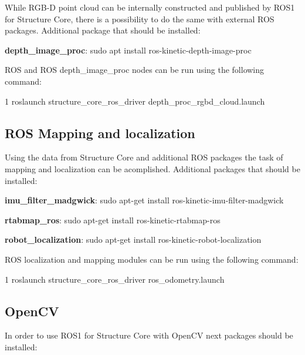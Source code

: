While R\+G\+B-\/D point cloud can be internally constructed and published by R\+O\+S1 for Structure Core, there is a possibility to do the same with external R\+OS packages. Additional package that should be installed\+:


\begin{DoxyItemize}
\item {\bfseries depth\+\_\+image\+\_\+proc}\+: sudo apt install ros-\/kinetic-\/depth-\/image-\/proc
\end{DoxyItemize}

R\+OS and R\+OS depth\+\_\+image\+\_\+proc nodes can be run using the following command\+:


\begin{DoxyCode}
1 roslaunch structure\_core\_ros\_driver depth\_proc\_rgbd\_cloud.launch
\end{DoxyCode}
\hypertarget{ros_start_localization}{}\subsection{R\+O\+S Mapping and localization}\label{ros_start_localization}
Using the data from Structure Core and additional R\+OS packages the task of mapping and localization can be acomplished. Additional packages that should be installed\+:


\begin{DoxyItemize}
\item {\bfseries imu\+\_\+filter\+\_\+madgwick}\+: sudo apt-\/get install ros-\/kinetic-\/imu-\/filter-\/madgwick
\item {\bfseries rtabmap\+\_\+ros}\+: sudo apt-\/get install ros-\/kinetic-\/rtabmap-\/ros
\item {\bfseries robot\+\_\+localization}\+: sudo apt-\/get install ros-\/kinetic-\/robot-\/localization
\end{DoxyItemize}

R\+OS localization and mapping modules can be run using the following command\+:


\begin{DoxyCode}
1 roslaunch structure\_core\_ros\_driver ros\_odometry.launch
\end{DoxyCode}
\hypertarget{ros_start_opencv}{}\subsection{Open\+CV}\label{ros_start_opencv}
In order to use R\+O\+S1 for Structure Core with Open\+CV next packages should be installed\+:


